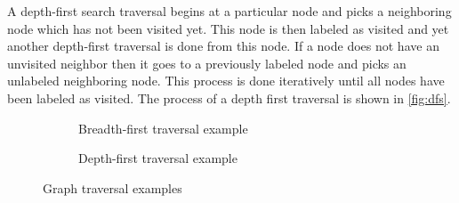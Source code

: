 A depth-first search traversal begins at a particular node and picks a neighboring node which has not been visited yet. 
This node is then labeled as visited and yet another depth-first traversal is done from this node. 
If a node does not have an unvisited neighbor then it goes to a previously labeled node and picks an unlabeled neighboring node. 
This process is done iteratively until all nodes have been labeled as visited.
The process of a depth first traversal is shown in \autoref{fig:dfs}.
\begin{figure}[ht]
	\begin{subfigure}{0.5\textwidth}
		\begin{center}
		\end{center}
		\caption{Breadth-first traversal example}
		\label{fig:bfs}
	\end{subfigure}%
	\begin{subfigure}{0.5\textwidth}
		\begin{center}
		\end{center}
		\caption{Depth-first traversal example}
		\label{fig:dfs}
	\end{subfigure}
	\caption{Graph traversal examples}
\end{figure}

